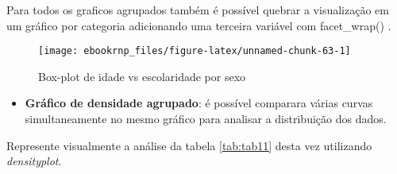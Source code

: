 \documentclass[12pt,]{style/krantz}
\makeatletter
\newenvironment{Shaded}{\begin{snugshade}}{\end{snugshade}}
\newcommand{\DataTypeTok}[1]{\textcolor[rgb]{0.13,0.29,0.53}{#1}}
\newcommand{\KeywordTok}[1]{\textcolor[rgb]{0.13,0.29,0.53}{\textbf{#1}}}
\newcommand{\NormalTok}[1]{#1}
\newcommand{\OperatorTok}[1]{\textcolor[rgb]{0.81,0.36,0.00}{\textbf{#1}}}
\newcommand{\OtherTok}[1]{\textcolor[rgb]{0.56,0.35,0.01}{#1}}
\newcommand{\StringTok}[1]{\textcolor[rgb]{0.31,0.60,0.02}{#1}}
\providecommand{\tightlist}{%
  \setlength{\itemsep}{0pt}\setlength{\parskip}{0pt}}
\renewenvironment{quote}{\begin{VF}}{\end{VF}}
\newenvironment{kframe}{%
\medskip{}
\setlength{\fboxsep}{.8em}
 \def\at@end@of@kframe{}%
 \ifinner\ifhmode%
  \def\at@end@of@kframe{\end{minipage}}%
  \begin{minipage}{\columnwidth}%
 \fi\fi%
 \def\FrameCommand##1{\hskip\@totalleftmargin \hskip-\fboxsep
 \colorbox{shadecolor}{##1}\hskip-\fboxsep
     \hskip-\linewidth \hskip-\@totalleftmargin \hskip\columnwidth}%
 \MakeFramed {\advance\hsize-\width
   \@totalleftmargin\z@ \linewidth\hsize
   \@setminipage}}%
 {\par\unskip\endMakeFramed%
 \at@end@of@kframe}
\renewenvironment{Shaded}{\begin{kframe}}{\end{kframe}}
\theoremstyle{definition}
\theoremstyle{definition}
\theoremstyle{definition}
\theoremstyle{remark}
\let\BeginKnitrBlock\begin \let\EndKnitrBlock\end
\makeatother
\begin{document}
\begin{quote}
Para todos os graficos agrupados também é possível quebrar a visualização em um gráfico por categoria adicionando uma terceira variável com facet\_wrap() .
\end{quote}

\begin{Shaded}
\end{Shaded}

\begin{figure}[H]

{\centering \texttt{[image: ebookrnp\_files/figure-latex/unnamed-chunk-63-1]} 

}

\caption{Box-plot de idade vs escolaridade por sexo}\label{fig:unnamed-chunk-63}
\end{figure}

\begin{itemize}
\tightlist
\item
  \textbf{Gráfico de densidade agrupado}: é possível comparara várias curvas simultaneamente no mesmo gráfico para analisar a distribuição dos dados.
\end{itemize}

\BeginKnitrBlock{example}
\protect\hypertarget{exm:unnamed-chunk-64}{}{\label{exm:unnamed-chunk-64} }Represente visualmente a análise da tabela \ref{tab:tab11} desta vez utilizando \emph{densityplot}.
\EndKnitrBlock{example}
\end{document}
